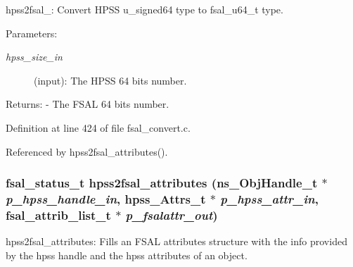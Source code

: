 hpss2fsal\_: Convert HPSS u\_\-signed64 type to fsal\_\-u64\_\-t type.

\begin{Desc}
\item[Parameters:]
\begin{description}
\item[{\em hpss\_\-size\_\-in}](input): The HPSS 64 bits number.\end{description}
\end{Desc}
\begin{Desc}
\item[Returns:]- The FSAL 64 bits number. \end{Desc}


Definition at line 424 of file fsal\_\-convert.c.

Referenced by hpss2fsal\_\-attributes().
\subsubsection[{hpss2fsal\_\-attributes}]{\setlength{\rightskip}{0pt plus 5cm}fsal\_\-status\_\-t hpss2fsal\_\-attributes (ns\_\-ObjHandle\_\-t $\ast$ {\em p\_\-hpss\_\-handle\_\-in}, \/  hpss\_\-Attrs\_\-t $\ast$ {\em p\_\-hpss\_\-attr\_\-in}, \/  fsal\_\-attrib\_\-list\_\-t $\ast$ {\em p\_\-fsalattr\_\-out})}\label{fsal__convert_8c_a38d336547d49c8dc635f4a0b473fbe5}


hpss2fsal\_\-attributes: Fills an FSAL attributes structure with the info provided by the hpss handle and the hpss attributes of an object.


